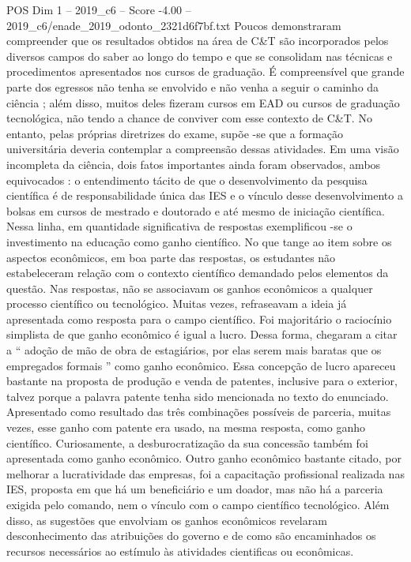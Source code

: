 \begin{textsample}{POS Dim 1 – 2019\_c6 – Score -4.00 – 2019\_c6/enade\_2019\_odonto\_2321d6f7bf.txt}
Poucos demonstraram compreender que os resultados obtidos na área de C\&T são incorporados pelos diversos campos do saber ao longo do tempo e que se consolidam nas técnicas e procedimentos apresentados nos cursos de graduação.
É compreensível que grande parte dos egressos não tenha se envolvido e não venha a seguir o caminho da ciência ; além disso, muitos deles fizeram cursos em EAD ou cursos de graduação tecnológica, não tendo a chance de conviver com esse contexto de C\&T.
No entanto, pelas próprias diretrizes do exame, supõe -se que a formação universitária deveria contemplar a compreensão dessas atividades.
Em uma visão incompleta da ciência, dois fatos importantes ainda foram observados, ambos equivocados : o entendimento tácito de que o desenvolvimento da pesquisa científica é de responsabilidade única das IES e o vínculo desse desenvolvimento a bolsas em cursos de mestrado e doutorado e até mesmo de iniciação científica.
Nessa linha, em quantidade significativa de respostas exemplificou -se o investimento na educação como ganho científico.
No que tange ao item sobre os aspectos econômicos, em boa parte das respostas, os estudantes não estabeleceram relação com o contexto científico demandado pelos elementos da questão.
Nas respostas, não se associavam os ganhos econômicos a qualquer processo científico ou tecnológico.
Muitas vezes, refraseavam a ideia já apresentada como resposta para o campo científico.
Foi majoritário o raciocínio simplista de que ganho econômico é igual a lucro.
Dessa forma, chegaram a citar a “ adoção de mão de obra de estagiários, por elas serem mais baratas que os empregados formais ” como ganho econômico.
Essa concepção de lucro apareceu bastante na proposta de produção e venda de patentes, inclusive para o exterior, talvez porque a palavra patente tenha sido mencionada no texto do enunciado.
Apresentado como resultado das três combinações possíveis de parceria, muitas vezes, esse ganho com patente era usado, na mesma resposta, como ganho científico.
Curiosamente, a desburocratização da sua concessão também foi apresentada como ganho econômico.
Outro ganho econômico bastante citado, por melhorar a lucratividade das empresas, foi a capacitação profissional realizada nas IES, proposta em que há um beneficiário e um doador, mas não há a parceria exigida pelo comando, nem o vínculo com o campo científico tecnológico.
Além disso, as sugestões que envolviam os ganhos econômicos revelaram desconhecimento das atribuições do governo e de como são encaminhados os recursos necessários ao estímulo às atividades cientificas ou econômicas.

\end{textsample}
